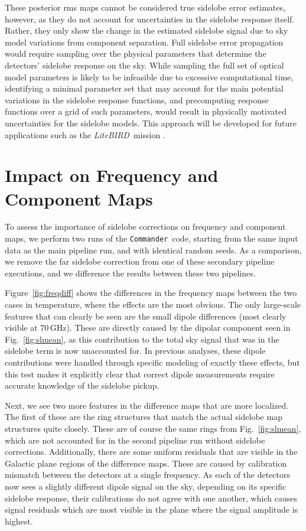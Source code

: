 \documentclass[twocolumn]{aa}
\def\LiteBIRD{\textit{LiteBIRD}}
\def\commander{\texttt{Commander}}
\begin{document}
These posterior rms maps cannot be considered true sidelobe error estimates, however, as they do not account for uncertainties in the sidelobe response itself. Rather, they only show the change in the estimated sidelobe signal due to sky model variations from component separation. Full sidelobe error propagation would require sampling over the physical parameters that determine the detectors' sidelobe response on the sky. While sampling the full set of optical model parameters is likely to be infeasible due to excessive computational time, identifying a minimal parameter set that may account for the main potential variations in the sidelobe response functions, and precomputing response functions over a grid of such parameters, would result in physically motivated uncertainties for the sidelobe models. This approach will be developed for future applications such as the \LiteBIRD\ mission \citep{LiteBIRD}.

\section{Impact on Frequency and Component Maps}

To assess the importance of sidelobe corrections on frequency and component maps, we perform two runs of the  \commander\ code, starting from the same input data as the main pipeline run, and with identical random seeds. As a comparison, we remove the far sidelobe correction from one of these secondary pipeline executions, and we difference the results between these two pipelines. 

Figure~\ref{fig:freqdiff} shows the differences in the frequency maps between the two cases in temperature, where the effects are the most obvious. The only large-scale features that can clearly be seen are the small dipole differences (most clearly visible at 70\,GHz). These are directly caused by the dipolar component seen in Fig.~\ref{fig:slmean}, as this contribution to the total sky signal that was in the sidelobe term is now unaccounted for. In previous analyses, these dipole contributions were handled through specific modeling of exactly these effects, but this test makes it explicitly clear that correct dipole measurements require accurate knowledge of the sidelobe pickup.

Next, we see two more features in the difference maps that are more localized. The first of these are the ring structures that match the actual sidelobe map structures quite closely. These are of course the same rings from Fig.~\ref{fig:slmean}, which are not accounted for in the second pipeline run without sidelobe corrections. Additionally, there are some uniform residuals that are visible in the Galactic plane regions of the difference maps. These are caused by calibration mismatch between the detectors at a single frequency. As each of the detectors now sees a slightly different dipole signal on the sky, depending on its specific sidelobe response, their calibrations do not agree with one another, which causes signal residuals which are most visible in the plane where the signal amplitude is highest.
\end{document}
